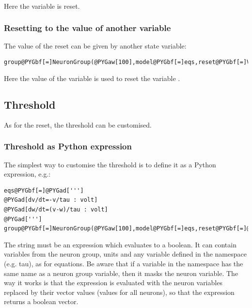 \documentclass[letterpaper,10pt,english]{manual}
\begin{document}
Here the variable  is reset.


\subsubsection{Resetting to the value of another variable}

The value of the reset can be given by another state variable:

\begin{Verbatim}[commandchars=@\[\]]
group@PYGbf[=]NeuronGroup(@PYGaw[100],model@PYGbf[=]eqs,reset@PYGbf[=]VariableReset(@PYGaw[0]@PYGbf[*]mV,state@PYGbf[=]@PYGad[']@PYGad[v]@PYGad['],resetvaluestate@PYGbf[=]@PYGad[']@PYGad[w]@PYGad[']),threshold@PYGbf[=]@PYGaw[10]@PYGbf[*]mV)
\end{Verbatim}

Here the value of the variable  is used to reset the variable .


\subsection{Threshold}

As for the reset, the threshold can be customised.


\subsubsection{Threshold as Python expression}

The simplest way to customise the threshold is to define it as a Python expression, e.g.:

\begin{Verbatim}[commandchars=@\[\]]
eqs@PYGbf[=]@PYGad[''']
@PYGad[dv/dt=-v/tau : volt]
@PYGad[dw/dt=(v-w)/tau : volt]
@PYGad[''']
group@PYGbf[=]NeuronGroup(@PYGaw[100],model@PYGbf[=]eqs,reset@PYGbf[=]@PYGaw[0]@PYGbf[*]mV,threshold@PYGbf[=]@PYGad["]@PYGad[v@textgreater[]=w]@PYGad["])
\end{Verbatim}

The string must be an expression which evaluates to a boolean. It can
contain variables from the neuron group, units and any variable defined in the namespace
(e.g. tau), as for equations. Be aware that if a variable in the namespace has the same
name as a neuron group variable, then it masks the neuron variable. The way it works is that
the expression is evaluated with the neuron variables replaced by their vector values (values for
all neurons), so that the expression returns a boolean vector.
\end{document}
